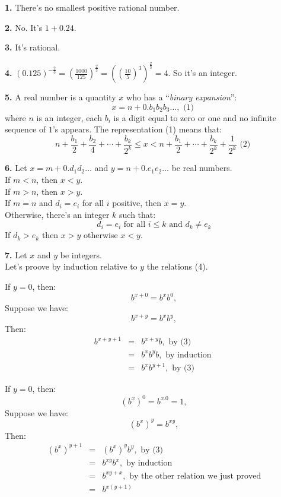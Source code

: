 \documentclass[a4paper,12pt]{article}
\newcommand{\newpar}[1]{\bigskip \noindent \textbf{#1.}}
\begin{document}
\newpar{1} There's no smallest positive rational number.

\newpar{2} No. It's $1 + 0.24$.

\newpar{3} It's rational.

\newpar{4} $(0.125)^{-\frac{2}{3}} = (\frac{1000}{125})^{\frac{2}{3}} = 
((\frac{10}{5})^3)^{\frac{2}{3}} = 4$.  So it's an integer.

\newpar{5} A real number is a quantity $x$ who has a 
``\emph{binary expansion}'':
\[ x = n + 0.b_1b_2b_3\ldots, \mbox{ (1) }\]
where $n$ is an integer, each $b_i$ is a digit equal to zero or one and no
infinite sequence of $1$'s appears.  The representation (1) means that:
\[n + \frac{b_1}{2} + \frac{b_2}{4} + \cdots + \frac{b_k}{2^k} \le x <
n + \frac{b_1}{2} + \cdots + \frac{b_k}{2^k} + \frac{1}{2^k} \mbox{ (2) } \]

\newpar{6} Let $x = m + 0.d_1d_2\ldots$ and $y = n + 0.e_1e_2\ldots$ be real
numbers.\\
If $m < n$, then $x < y$.\\
If $m > n$, then $x > y$.\\
If $m = n$ and $d_i = e_i$ for all $i$ positive, then $x = y$.\\
Otherwise, there's an integer $k$ such that:
\[ d_i = e_i \mbox{ for all } i \le k \mbox{ and } d_k \not= e_k \]
If $d_k > e_k$ then $x > y$ otherwise $x < y$.

\newpar{7} Let $x$ and $y$ be integers.\\
Let's proove by induction relative to $y$ the relations (4).

\noindent
If $y=0$, then:
\[ b^{x+0} = b^x b^0,\]
Suppose we have:
\[ b^{x+y} = b^x b^y,\]
Then:
\begin{eqnarray*}
b^{x+y+1} & = & b^{x+y} b, \mbox{ by (3) }\\
& = & b^x b^y b, \mbox{ by induction }\\
& = & b^x b^{y+1}, \mbox{ by (3) }
\end{eqnarray*}

If $y = 0$, then:
\[ (b^x)^0 = b^{x.0} = 1, \]
Suppose we have:
\[ (b^x)^y = b^{xy} ,\]
Then:
\begin{eqnarray*}
(b^x)^{y+1} & = & (b^x)^y b^y, \mbox{ by (3) }\\
& = & b^{xy} b^x, \mbox{ by induction }\\
& = & b^{xy + x}, \mbox{ by the other relation we just proved}\\
& = & b^{x(y+1)}
\end{eqnarray*}
\end{document}
